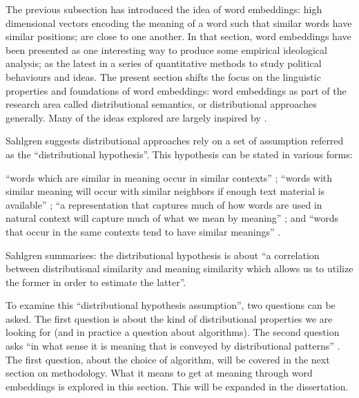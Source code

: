 \documentclass[
  openany]{book}
\begin{document}
The previous subsection has introduced the idea of word embeddings: high dimensional vectors encoding the meaning of a word such that similar words have similar positions; are close to one another. In that section, word embeddings have been presented as one interesting way to produce some empirical ideological analysis; as the latest in a series of quantitative methods to study political behaviours and ideas. The present section shifts the focus on the linguistic properties and foundations of word embeddings: word embeddings as part of the research area called distributional semantics, or distributional approaches generally. Many of the ideas explored are largely inspired by \citet{sahlgren2008distributional}.

Sahlgren suggests distributional approaches rely on a set of assumption referred as the ``distributional hypothesis''. This hypothesis can be stated in various forms:

``words which are similar in meaning occur in similar contexts'' \citep{rubenstein1965contextual}; ``words with similar meaning will occur with similar neighbors if enough text material is available'' \citep{schutze1995information}; ``a representation that captures much of how words are used in natural context will capture much of what we mean by meaning'' \citep{landauer1997solution}; and ``words that occur in the same contexts tend to have similar meanings'' \citep{pantel2005inducing}.

Sahlgren summarises: the distributional hypothesis is about ``a correlation between distributional similarity and meaning similarity which allows us to utilize the former in order to estimate the latter''.

To examine this ``distributional hypothesis assumption'', two questions can be asked. The first question is about the kind of distributional properties we are looking for (and in practice a question about algorithms). The second question asks ``in what sense it is meaning that is conveyed by distributional patterns'' \citep{sahlgren2008distributional}. The first question, about the choice of algorithm, will be covered in the next section on methodology. What it means to get at meaning through word embeddings is explored in this section. This will be expanded in the dissertation.
\end{document}
